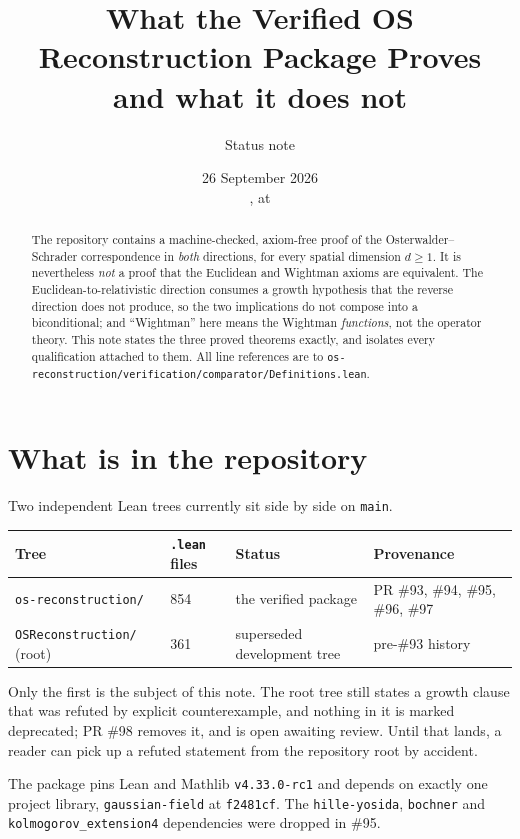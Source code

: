 \documentclass[11pt,a4paper]{article}
\title{What the Verified OS Reconstruction Package Proves\\
{\large and what it does not}}
\author{Status note}
\date{26 September 2026 \\[2pt]
{\small \lean{xiyin137/OSreconstruction}, \lean{main} at \lean{32feb1f5}}}
\newcommand{\lean}[1]{\texttt{#1}}
\begin{document}
\maketitle

\begin{abstract}
The repository contains a machine-checked, axiom-free proof of the
Osterwalder--Schrader correspondence in \emph{both} directions, for every
spatial dimension $d \ge 1$. It is nevertheless \emph{not} a proof that the
Euclidean and Wightman axioms are equivalent. The Euclidean-to-relativistic
direction consumes a growth hypothesis that the reverse direction does not
produce, so the two implications do not compose into a biconditional; and
``Wightman'' here means the Wightman \emph{functions}, not the operator theory.
This note states the three proved theorems exactly, and isolates every
qualification attached to them. All line references are to
\lean{os-reconstruction/verification/comparator/Definitions.lean}.
\end{abstract}

\section{What is in the repository}

Two independent Lean trees currently sit side by side on \lean{main}.

\begin{center}
\begin{tabular}{@{}llll@{}}
\toprule
Tree & \lean{.lean} files & Status & Provenance \\
\midrule
\lean{os-reconstruction/} & 854 & the verified package & PR \#93, \#94, \#95, \#96, \#97 \\
\lean{OSReconstruction/} (root) & 361 & superseded development tree & pre-\#93 history \\
\bottomrule
\end{tabular}
\end{center}

Only the first is the subject of this note. The root tree still states a
growth clause that was refuted by explicit counterexample, and nothing in it is
marked deprecated; PR \#98 removes it, and is open awaiting review. Until that
lands, a reader can pick up a refuted statement from the repository root by
accident.

The package pins Lean and Mathlib \lean{v4.33.0-rc1} and depends on exactly one
project library, \lean{gaussian-field} at \lean{f2481cf}. The \lean{hille-yosida},
\lean{bochner} and \lean{kolmogorov\_extension4} dependencies were dropped in \#95.
\end{document}
